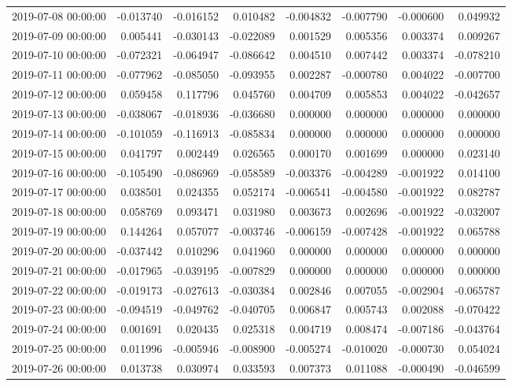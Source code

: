 \begin{tabular}{lrrrrrrr}
2019-07-08 00:00:00 & -0.013740 & -0.016152 & 0.010482 & -0.004832 & -0.007790 & -0.000600 & 0.049932 \\
2019-07-09 00:00:00 & 0.005441 & -0.030143 & -0.022089 & 0.001529 & 0.005356 & 0.003374 & 0.009267 \\
2019-07-10 00:00:00 & -0.072321 & -0.064947 & -0.086642 & 0.004510 & 0.007442 & 0.003374 & -0.078210 \\
2019-07-11 00:00:00 & -0.077962 & -0.085050 & -0.093955 & 0.002287 & -0.000780 & 0.004022 & -0.007700 \\
2019-07-12 00:00:00 & 0.059458 & 0.117796 & 0.045760 & 0.004709 & 0.005853 & 0.004022 & -0.042657 \\
2019-07-13 00:00:00 & -0.038067 & -0.018936 & -0.036680 & 0.000000 & 0.000000 & 0.000000 & 0.000000 \\
2019-07-14 00:00:00 & -0.101059 & -0.116913 & -0.085834 & 0.000000 & 0.000000 & 0.000000 & 0.000000 \\
2019-07-15 00:00:00 & 0.041797 & 0.002449 & 0.026565 & 0.000170 & 0.001699 & 0.000000 & 0.023140 \\
2019-07-16 00:00:00 & -0.105490 & -0.086969 & -0.058589 & -0.003376 & -0.004289 & -0.001922 & 0.014100 \\
2019-07-17 00:00:00 & 0.038501 & 0.024355 & 0.052174 & -0.006541 & -0.004580 & -0.001922 & 0.082787 \\
2019-07-18 00:00:00 & 0.058769 & 0.093471 & 0.031980 & 0.003673 & 0.002696 & -0.001922 & -0.032007 \\
2019-07-19 00:00:00 & 0.144264 & 0.057077 & -0.003746 & -0.006159 & -0.007428 & -0.001922 & 0.065788 \\
2019-07-20 00:00:00 & -0.037442 & 0.010296 & 0.041960 & 0.000000 & 0.000000 & 0.000000 & 0.000000 \\
2019-07-21 00:00:00 & -0.017965 & -0.039195 & -0.007829 & 0.000000 & 0.000000 & 0.000000 & 0.000000 \\
2019-07-22 00:00:00 & -0.019173 & -0.027613 & -0.030384 & 0.002846 & 0.007055 & -0.002904 & -0.065787 \\
2019-07-23 00:00:00 & -0.094519 & -0.049762 & -0.040705 & 0.006847 & 0.005743 & 0.002088 & -0.070422 \\
2019-07-24 00:00:00 & 0.001691 & 0.020435 & 0.025318 & 0.004719 & 0.008474 & -0.007186 & -0.043764 \\
2019-07-25 00:00:00 & 0.011996 & -0.005946 & -0.008900 & -0.005274 & -0.010020 & -0.000730 & 0.054024 \\
2019-07-26 00:00:00 & 0.013738 & 0.030974 & 0.033593 & 0.007373 & 0.011088 & -0.000490 & -0.046599 \\

\end{tabular}
